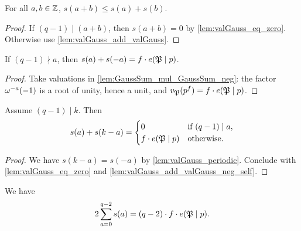 \begin{lemma}
  \label{lem:valGauss_subadditive}
  \leanok
  For all $a, b \in \mathbb{Z}$, $s(a + b) \leq s(a) + s(b)$.
\end{lemma}

\begin{proof}
  \leanok
  If $(q-1) \mid (a+b)$, then $s(a+b) = 0$ by \ref{lem:valGauss_eq_zero}. Otherwise use
  \ref{lem:valGauss_add_valGauss}.
\end{proof}

\begin{lemma}
  \label{lem:valGauss_add_valGauss_neg_self}
  \leanok
  If $(q-1) \nmid a$, then $s(a) + s(-a) = f \cdot e(\mathfrak{P} \mid p)$.
\end{lemma}

\begin{proof}
  \leanok
  Take valuations in \ref{lem:GaussSum_mul_GaussSum_neg}: the factor $\omega^{-a}(-1)$ is a root of
  unity, hence a unit, and $v_{\mathfrak{P}}(p^f) = f \cdot e(\mathfrak{P} \mid p)$.
\end{proof}

\begin{lemma}
  \label{lem:valGauss_add_valGauss_sub_self}
  \leanok
  Assume $(q-1) \mid k$. Then
  \[
    s(a) + s(k - a) = \begin{cases} 0 & \text{if } (q-1) \mid a, \\
    f \cdot e(\mathfrak{P} \mid p) & \text{otherwise.} \end{cases}
  \]
\end{lemma}

\begin{proof}
  \leanok
  We have $s(k - a) = s(-a)$ by \ref{lem:valGauss_periodic}. Conclude with
  \ref{lem:valGauss_eq_zero} and \ref{lem:valGauss_add_valGauss_neg_self}.
\end{proof}

\begin{lemma}
  \label{lem:s_sum}
  \leanok
  We have
  \[
    2 \sum_{a=0}^{q-2} s(a) = (q-2) \cdot f \cdot e(\mathfrak{P} \mid p).
  \]
\end{lemma}

